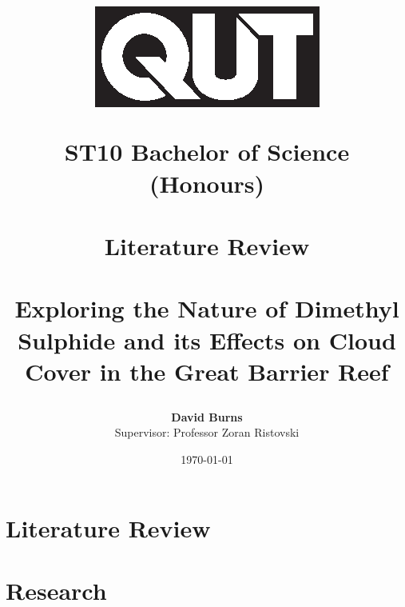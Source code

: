 \documentclass[11pt,a4paper]{report}
\title{ 
	 	\begin{figure}[h]
	 	    \centering
	 	    \includegraphics[scale=0.75]{Fig/QUT_Square_Black.eps}
	 	\end{figure}
			\textbf{ST10 Bachelor of Science (Honours)} \\
			~\\
			\Huge 
			\textbf{Literature Review} \\
			~\\
			\Large
			\textbf{Exploring the Nature of Dimethyl Sulphide and its Effects on Cloud Cover in the Great Barrier Reef} \\
	}
\author{\textbf{David Burns}\\
			Supervisor: Professor Zoran Ristovski}
\date{\today}
\begin{document}

\maketitle

\newpage

\newpage %







\tableofcontents

\newpage

\printnoidxglossaries

\newpage



\part{Literature Review}















\part{Research} %


\newpage
\printbibliography[heading=bibintoc]%
\end{document}
